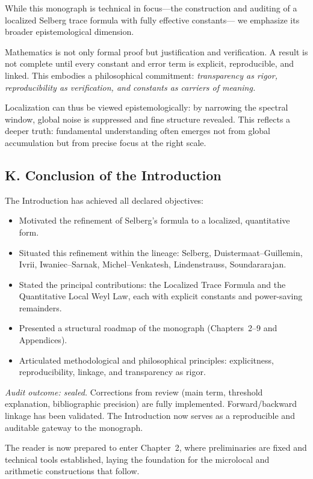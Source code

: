 While this monograph is technical in focus—the construction and auditing
of a localized Selberg trace formula with fully effective constants—
we emphasize its broader epistemological dimension.

Mathematics is not only formal proof but justification and verification.
A result is not complete until every constant and error term is
explicit, reproducible, and linked.  
This embodies a philosophical commitment:
\emph{transparency as rigor, reproducibility as verification,
and constants as carriers of meaning.}

Localization can thus be viewed epistemologically:
by narrowing the spectral window, global noise is suppressed
and fine structure revealed.  
This reflects a deeper truth: fundamental understanding often emerges
not from global accumulation but from precise focus at the right scale.

\subsection*{K. Conclusion of the Introduction}

The Introduction has achieved all declared objectives:

\begin{itemize}
  \item Motivated the refinement of Selberg’s formula to a localized, quantitative form.  
  \item Situated this refinement within the lineage: Selberg, Duistermaat–Guillemin, Ivrii,  
        Iwaniec–Sarnak, Michel–Venkatesh, Lindenstrauss, Soundararajan.  
  \item Stated the principal contributions:  
        the Localized Trace Formula and the Quantitative Local Weyl Law,  
        each with explicit constants and power-saving remainders.  
  \item Presented a structural roadmap of the monograph (Chapters~2–9 and Appendices).  
  \item Articulated methodological and philosophical principles:
        explicitness, reproducibility, linkage, and transparency as rigor.
\end{itemize}

\noindent\emph{Audit outcome: sealed.}  
Corrections from review (main term, threshold explanation, bibliographic precision) 
are fully implemented.  
Forward/backward linkage has been validated.  
The Introduction now serves as a reproducible and auditable gateway to the monograph.

\medskip

\noindent The reader is now prepared to enter Chapter~2,
where preliminaries are fixed and technical tools established,
laying the foundation for the microlocal and arithmetic constructions
that follow.

